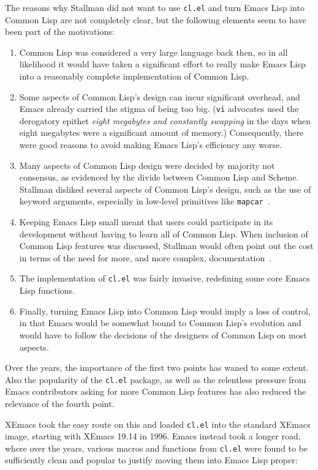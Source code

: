 \documentclass[format=acmsmall, review]{acmart}
\newcommand \Elisp {Emacs Lisp}
\begin{document}
The reasons why Stallman did not want to use \texttt{cl.el} and turn \Elisp{}
into Common Lisp are not completely clear, but the following elements seem
to have been part of the motivations:
\begin{enumerate}
\item Common Lisp was considered a very large language back then, so in all
  likelihood it would have taken a significant effort to really make
  \Elisp{} into a reasonably complete implementation of Common Lisp.
\item Some aspects of Common Lisp's design can incur 
  significant overhead, and Emacs already carried the stigma of being
  too big.  (\texttt{vi} advocates used the derogatory epithet \emph{eight
  megabytes and
    constantly swapping} in the days when eight megabytes were a
  significant amount of memory.)  Consequently, there were good reasons to avoid making
  \Elisp{}'s efficiency any worse.
\item Many aspects of Common Lisp design were decided by majority not consensus, as
  evidenced by the divide between Common Lisp and Scheme.
  Stallman disliked several aspects of Common Lisp's design, such as the use of
  keyword arguments, especially in low-level primitives like
  \texttt{mapcar}~\cite{RMS-keyword-args-are-clunky}.
\item Keeping \Elisp{} small meant that users could participate in its
  development without having to learn all of Common Lisp.  When inclusion of
  Common Lisp features was discussed, Stallman would often point out the cost
  in terms of the need for more, and more complex,
  documentation~\cite{RMS-cl-big-doc}.
\item The implementation of \texttt{cl.el} was fairly invasive, redefining
  some core \Elisp{} functions.
\item Finally, turning \Elisp{} into Common Lisp would imply a loss of control,
  in that Emacs would be somewhat bound to Common Lisp's evolution and would
  have to follow the decisions of the designers of Common Lisp on most aspects.
\end{enumerate}
Over the years, the importance of the first two points has waned to some
extent.  Also the popularity of the \texttt{cl.el} package, as well as the
relentless pressure from Emacs contributors asking for more Common Lisp
features has also reduced the relevance of the fourth point.

XEmacs took the easy route on this and loaded \texttt{cl.el} into the
standard XEmacs image, starting with XEmacs 19.14 in 1996.  Emacs instead
took a longer road, where over the years, various macros and functions from
\texttt{cl.el} were found to be sufficiently clean and popular to justify
moving them into \Elisp{} proper:
\end{document}
